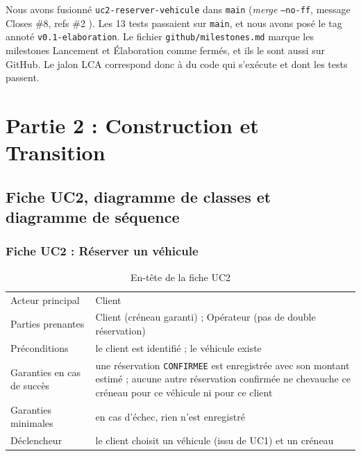\documentclass[11pt,a4paper]{article}
\begin{document}
Nous avons fusionné \texttt{uc2-reserver-vehicule} dans \texttt{main}
(\emph{merge} \texttt{--no-ff}, message \og Closes \#8, refs \#2 \fg{}). Les 13
tests passaient sur \texttt{main}, et nous avons posé le tag annoté
\texttt{v0.1-elaboration}. Le fichier \texttt{github/milestones.md} marque les
milestones Lancement et Élaboration comme fermés, et ils le sont aussi sur GitHub.
Le jalon LCA correspond donc à du code qui s'exécute et dont les tests passent.

\section{Partie 2 : Construction et Transition}

\subsection{Fiche UC2, diagramme de classes et diagramme de séquence}

\subsubsection*{Fiche UC2 : Réserver un véhicule}

\begin{table}[H]
\centering
\begin{tabularx}{\textwidth}{l L}
\toprule
Acteur principal & Client \\
Parties prenantes & Client (créneau garanti) ; Opérateur (pas de double réservation) \\
Préconditions & le client est identifié ; le véhicule existe \\
Garanties en cas de succès & une réservation \texttt{CONFIRMEE} est enregistrée avec son montant estimé ; aucune autre réservation confirmée ne chevauche ce créneau pour ce véhicule ni pour ce client \\
Garanties minimales & en cas d'échec, rien n'est enregistré \\
Déclencheur & le client choisit un véhicule (issu de UC1) et un créneau \\
\bottomrule
\end{tabularx}
\caption{En-tête de la fiche UC2}
\end{table}
\end{document}
